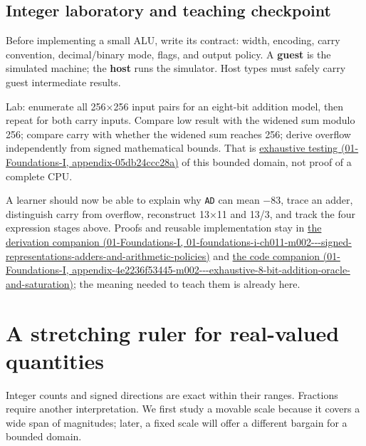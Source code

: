 \subsection{Integer laboratory and teaching checkpoint}\label{05-engine-i-ch001-integer-laboratory-and-teaching-checkpoint}

Before implementing a small ALU, write its contract: width, encoding, carry convention, decimal/binary mode, flags, and output policy. A \textbf{guest} is the simulated machine; the \textbf{host} runs the simulator. Host types must safely carry guest intermediate results.

Lab: enumerate all 256×256 input pairs for an eight-bit addition model, then repeat for both carry inputs. Compare low result with the widened sum modulo 256; compare carry with whether the widened sum reaches 256; derive overflow independently from signed mathematical bounds. That is \href{../01-Foundations-I/main.pdf\#nameddest=appendix-05db24ccc28a}{exhaustive testing (01-Foundations-I, appendix-05db24ccc28a)} of this bounded domain, not proof of a complete CPU.

A learner should now be able to explain why \texttt{AD} can mean −83, trace an adder, distinguish carry from overflow, reconstruct 13×11 and 13/3, and track the four expression stages above. Proofs and reusable implementation stay in \href{../01-Foundations-I/main.pdf\#nameddest=01-foundations-i-ch011-m002---signed-representations-adders-and-arithmetic-policies}{the derivation companion (01-Foundations-I, 01-foundations-i-ch011-m002-\/-\/-signed-representations-adders-and-arithmetic-policies)} and \href{../01-Foundations-I/main.pdf\#nameddest=appendix-4e2236f53445-m002---exhaustive-8-bit-addition-oracle-and-saturation}{the code companion (01-Foundations-I, appendix-4e2236f53445-m002-\/-\/-exhaustive-8-bit-addition-oracle-and-saturation)}; the meaning needed to teach them is already here.

\section{A stretching ruler for real-valued quantities}\label{05-engine-i-ch001-a-stretching-ruler-for-real-valued-quantities}

Integer counts and signed directions are exact within their ranges. Fractions require another interpretation. We first study a movable scale because it covers a wide span of magnitudes; later, a fixed scale will offer a different bargain for a bounded domain.


